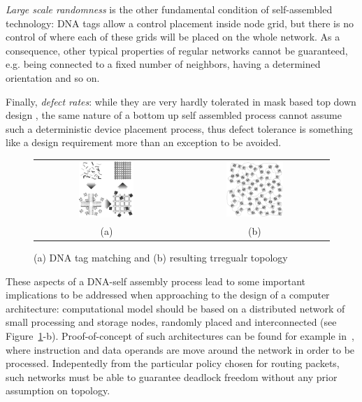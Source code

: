 \emph{Large scale randomness} is the other fundamental condition of
self-assembled technology: DNA tags allow a control placement inside
node grid, but there is no control of where each of these  grids will
be placed on the whole network. As a consequence, other typical
properties of regular networks cannot be guaranteed, e.g. being
connected to a fixed number of neighbors, having a determined
orientation and so on.

Finally, \emph{defect rates}: while they are very hardly tolerated in mask
based top down design , the same nature of a bottom up self
assembled process cannot assume such a deterministic device placement
process, thus defect tolerance is something like a design requirement
more than an exception to be avoided.

\begin{figure}
\centering
\begin{tabular}{cc}
    \includegraphics[width=0.40\textwidth]{pictures/dna2b.eps} &
    \includegraphics[width=0.40\textwidth]{pictures/dna1_complex2.eps} \\
 (a) & (b)
 \end{tabular}
  \caption{(a) DNA tag matching and (b) resulting trregualr topology}
  \label{fig:nana}
\end{figure}
These aspects of a DNA-self assembly process lead to some important
implications to be addressed when approaching to the design of
a computer architecture: computational model should be based on a
distributed network of small processing and storage nodes, randomly
placed and interconnected (see Figure~\ref{fig:nana}-b).
Proof-of-concept of such architectures can be found for
example in~\cite{patwardhan2006_1}, where instruction and data
operands are move around the network in order to be processed.
Indepentedly from the particular policy chosen for routing packets,
such networks must be able to guarantee deadlock freedom without any
prior assumption on topology.

